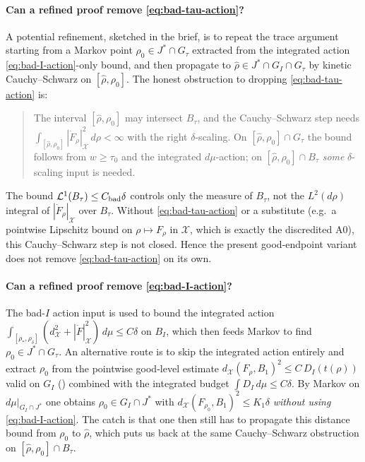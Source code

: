 \documentclass[11pt]{article}
\theoremstyle{definition}
\newcommand{\rstar}{\rho_{*}}
\newcommand{\rdel}{\rho_\delta}
\newcommand{\rhad}{\widehat\rho}
\newcommand{\X}{\mathcal X}
\begin{document}
\paragraph{Can a refined proof remove \eqref{eq:bad-tau-action}?}
A potential refinement, sketched in the brief, is to repeat the
trace argument starting from a Markov point
$\rho_0\in J^*\cap G_\tau$ extracted from the integrated action
\eqref{eq:bad-I-action}-only bound, and then propagate to
$\rhad\in J^*\cap G_I\cap G_\tau$ by kinetic Cauchy--Schwarz on
$[\rhad,\rho_0]$.  The honest obstruction to dropping
\eqref{eq:bad-tau-action} is:
\begin{quote}
The interval $[\rhad,\rho_0]$ may intersect $B_\tau$, and the
Cauchy--Schwarz step needs
$\int_{[\rhad,\rho_0]}|\dot F_\rho|_\X^2\,d\rho<\infty$ with the
right $\delta$-scaling.  On $[\rhad,\rho_0]\cap G_\tau$ the bound
follows from $w\ge\tau_0$ and the integrated $d\mu$-action; on
$[\rhad,\rho_0]\cap B_\tau$ \emph{some} $\delta$-scaling input is
needed.
\end{quote}
The bound \(\mathcal L^1(B_\tau)\le C_{\rm bad}\delta\) controls only
the measure of $B_\tau$, not the $L^2(d\rho)$ integral of
$|\dot F_\rho|_\X$ over $B_\tau$.  Without \eqref{eq:bad-tau-action} or
a substitute (e.g.\ a pointwise Lipschitz bound on $\rho\mapsto F_\rho$
in $\X$, which is exactly the discredited A0), this Cauchy--Schwarz
step is not closed.  Hence the present good-endpoint variant does not
remove \eqref{eq:bad-tau-action} on its own.

\paragraph{Can a refined proof remove \eqref{eq:bad-I-action}?}
The bad-$I$ action input is used to bound the integrated action
$\int_{[\rstar,\rdel]}(d_\X^2+|\dot F|_\X^2)\,d\mu\le C\delta$ on $B_I$,
which then feeds Markov to find $\rho_0\in J^*\cap G_\tau$.  An
alternative route is to skip the integrated action entirely and
extract $\rho_0$ from the pointwise good-level estimate
$d_\X(F_\rho,B_1)^2\le C\,D_I(t(\rho))$ valid on $G_I$
(\cite[Hyp.~3.5]{WeightedMetricTrace}) combined with the integrated
budget $\int D_I\,d\mu\le C\delta$.  By Markov on
$d\mu|_{G_I\cap J^*}$ one obtains $\rho_0\in G_I\cap J^*$ with
$d_\X(F_{\rho_0},B_1)^2\le K_1\delta$ \emph{without using}
\eqref{eq:bad-I-action}.  The catch is that one then still has to
propagate this distance bound from $\rho_0$ to $\rhad$, which puts us
back at the same Cauchy--Schwarz obstruction on
$[\rhad,\rho_0]\cap B_\tau$.
\end{document}
